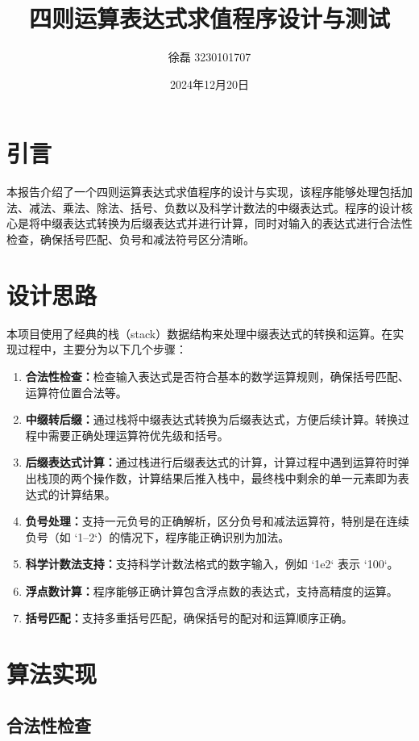 \documentclass{article}
\title{四则运算表达式求值程序设计与测试}
\author{徐磊 3230101707}
\date{2024年12月20日}
\begin{document}
\maketitle

\section{引言}

本报告介绍了一个四则运算表达式求值程序的设计与实现，该程序能够处理包括加法、减法、乘法、除法、括号、负数以及科学计数法的中缀表达式。程序的设计核心是将中缀表达式转换为后缀表达式并进行计算，同时对输入的表达式进行合法性检查，确保括号匹配、负号和减法符号区分清晰。

\section{设计思路}

本项目使用了经典的栈（stack）数据结构来处理中缀表达式的转换和运算。在实现过程中，主要分为以下几个步骤：

\begin{enumerate}
    \item \textbf{合法性检查：}检查输入表达式是否符合基本的数学运算规则，确保括号匹配、运算符位置合法等。
    \item \textbf{中缀转后缀：}通过栈将中缀表达式转换为后缀表达式，方便后续计算。转换过程中需要正确处理运算符优先级和括号。
    \item \textbf{后缀表达式计算：}通过栈进行后缀表达式的计算，计算过程中遇到运算符时弹出栈顶的两个操作数，计算结果后推入栈中，最终栈中剩余的单一元素即为表达式的计算结果。
    \item \textbf{负号处理：}支持一元负号的正确解析，区分负号和减法运算符，特别是在连续负号（如 `1--2`）的情况下，程序能正确识别为加法。
    \item \textbf{科学计数法支持：}支持科学计数法格式的数字输入，例如 `1e2` 表示 `100`。
    \item \textbf{浮点数计算：}程序能够正确计算包含浮点数的表达式，支持高精度的运算。
    \item \textbf{括号匹配：}支持多重括号匹配，确保括号的配对和运算顺序正确。
\end{enumerate}

\section{算法实现}

\subsection{合法性检查}
\end{document}
